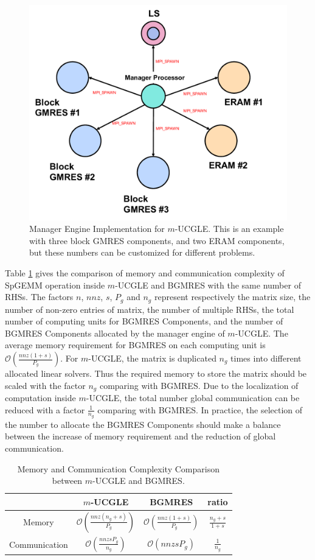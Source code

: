 \begin{figure}[htbp]
	\centering
	\includegraphics[width=4.8in]{fig/ucmgle.pdf}
	\caption{Manager Engine Implementation for $m$-UCGLE. This is an example with three block GMRES components, and two ERAM components, but these numbers can be customized for different problems.}
	\label{fig:ucmgle}
\end{figure}

Table \ref{memory} gives the comparison of memory and communication complexity of SpGEMM operation inside $m$-UCGLE and BGMRES with the same number of RHSs. The factors $n$, $nnz$, $s$, $P_g$ and $n_g$ represent respectively the matrix size, the number of non-zero entries of matrix, the number of multiple RHSs, the total number of computing units for BGMRES Components, and the number of BGMRES Components allocated by the manager engine of $m$-UCGLE. The average memory requirement for BGMRES on each computing unit is $\mathcal{O}(\frac{nnz(1+s)}{P_{g}})$. For $m$-UCGLE, the matrix is duplicated $n_g$ times into different allocated linear solvers. Thus the required memory to store the matrix should be scaled with the factor $n_g$ comparing with BGMRES. Due to the localization of computation inside $m$-UCGLE, the total number global communication can be reduced with a factor $\frac{1}{n_g}$ comparing with BGMRES. In practice, the selection of the number to allocate the BGMRES Components should make a balance between the increase of memory requirement and the reduction of global communication.

\begin{table}[htbp]
	\renewcommand{\arraystretch}{1.4}
	\small	
	\caption{Memory and Communication Complexity Comparison between $m$-UCGLE and BGMRES.}
	\label{memory}
	\centering
	\begin{tabular}{c|c|c|c}
		\toprule
		& $m$-UCGLE & BGMRES & ratio  \\
		\midrule
		Memory  &$\mathcal{O}(\frac{nnz(n_g+s)}{P_{g}})$& $\mathcal{O}(\frac{nnz(1+s)}{P_{g}})$ & $\frac{n_g+s}{1+s}$\\
		\midrule
		Communication & $\mathcal{O}(\frac{nnzsP_g}{n_g})$ & $\mathcal{O}(nnzsP_g)$ & $\frac{1}{n_g}$   \\
		\bottomrule
	\end{tabular}
\end{table}

